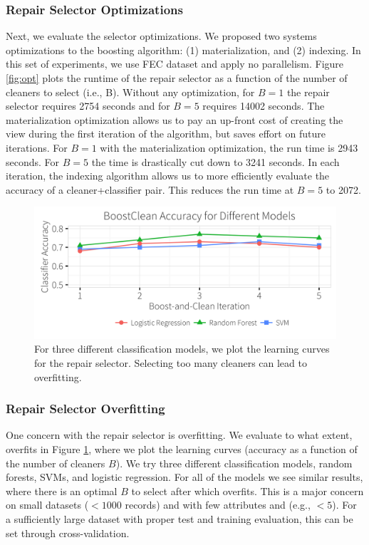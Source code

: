  \subsubsection{Repair Selector Optimizations}
 Next, we evaluate the selector optimizations. We proposed two systems optimizations to the boosting algorithm: (1) materialization, and (2) indexing.
 In this set of experiments, we use FEC dataset and apply no parallelism.
 Figure \ref{fig:opt} plots the runtime of the repair selector as a function of the number of cleaners to select (i.e., B).
 Without any optimization, for $B=1$ the repair selector requires 2754 seconds and for $B=5$ requires 14002 seconds.
 The materialization optimization allows us to pay an up-front cost of creating the view during the first iteration of the algorithm, but saves effort on future iterations.
 For $B=1$ with the materialization optimization, the run time is 2943 seconds.
 For $B=5$ the time is drastically cut down to 3241 seconds.
 In each iteration, the indexing algorithm allows us to more efficiently evaluate the accuracy of a cleaner+classifier pair.
 This reduces the run time at $B=5$ to 2072.
 
 \begin{figure}[t]
\centering
 \includegraphics[width=0.9\columnwidth]{exp/learn.png}
 \caption{For three different classification models, we plot the learning curves for the repair selector. Selecting too many cleaners can lead to overfitting.
 \label{fig:learning}}
\end{figure}
 
 \subsubsection{Repair Selector Overfitting}
 One concern with the repair selector is overfitting. We evaluate to what extent, \sys overfits in Figure \ref{fig:learning}, where we plot the learning curves (accuracy as a function of the number of cleaners $B$).
 We try three different classification models, random forests, SVMs, and logistic regression.
 For all of the models we see similar results, where there is an optimal $B$ to select after which \sys overfits.
This is a major concern on small datasets ($<1000$ records) and with few attributes and (e.g., $<5$). 
For a sufficiently large dataset with proper test and training evaluation, this can be set through cross-validation. 


 


